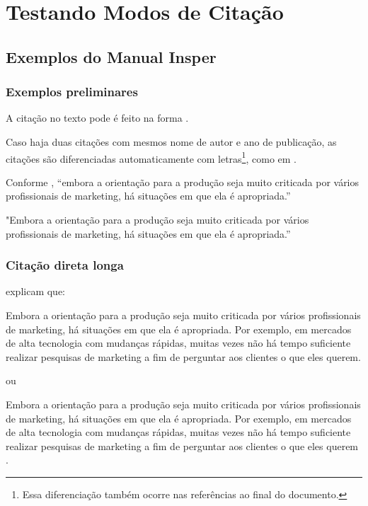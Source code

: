 \usepackage{listings}
\chapter{Testando Modos de Citação}
\section{Exemplos do Manual Insper}

\subsection{Exemplos preliminares}

A citação no texto pode é feito na forma \textcite{rego1994pureza}.

Caso haja duas citações com mesmos nome de autor e ano de publicação, as citações são diferenciadas automaticamente com letras\footnote{Essa diferenciação também ocorre nas referências ao final do documento.}, como em \textcite{rego1994usina}.

Conforme \textcite[8]{churchill2012marketing}, “embora a orientação para a produção seja muito criticada por vários profissionais de marketing, há situações em que ela é apropriada.”

"Embora a orientação para a produção seja muito criticada por vários
profissionais de marketing, há situações em que ela é apropriada.” \parencite[8]{churchill2012marketing} 

\subsection{Citação direta longa}

\textcite[8]{churchill2012marketing} explicam que:

\begin{citacao}
Embora a orientação para a produção seja muito criticada
por vários profissionais de marketing, há situações em
que ela é apropriada. Por exemplo, em mercados de alta
tecnologia com mudanças rápidas, muitas vezes não há
tempo suficiente realizar pesquisas de marketing a fim de
perguntar aos clientes o que eles querem.
\end{citacao}

ou

\begin{citacao}
Embora a orientação para a produção seja muito criticada
por vários profissionais de marketing, há situações em
que ela é apropriada. Por exemplo, em mercados de alta
tecnologia com mudanças rápidas, muitas vezes não há
tempo suficiente realizar pesquisas de marketing a fim de
perguntar aos clientes o que eles querem \parencite{churchill2012marketing}.
\end{citacao}

